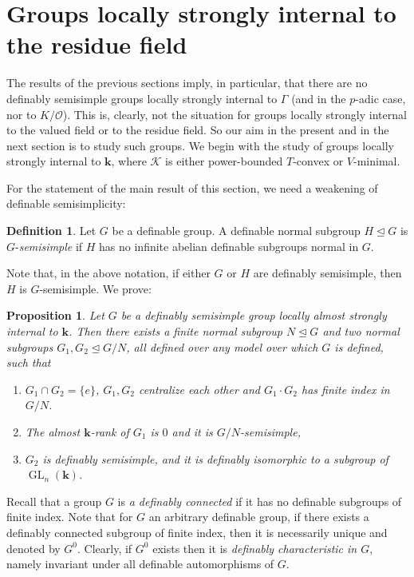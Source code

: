 \documentclass[11pt]{amsart}
\DeclareMathOperator{\gl}{GL} \DeclareMathOperator{\agl}{AGL}
\newtheorem{proposition}[theorem]{Proposition}
\theoremstyle{definition}
\newtheorem{definition}[theorem]{Definition}
\newcommand{\bk}{\textbf{k}}
\newcommand{\CK}{{\mathcal K}}
\newcommand{\CO}{{\mathcal O}}
\newcommand{\0}{\emptyset}
\begin{document}
\section{Groups locally strongly internal to the residue field}
The results of the previous sections imply, in particular, that there are no definably semisimple groups locally strongly internal to $\Gamma$ (and in the $p$-adic case, nor to $K/\CO$). This is, clearly, not the situation for groups locally strongly internal to the valued field or to the residue field. So our aim in the present and in the next section is to study such groups. We begin with the study of groups locally strongly internal to $\bk$, where $\CK$ is either power-bounded $T$-convex or $V$-minimal. 

For the statement of the main result of this section, we need a weakening of definable semisimplicity: 

\begin{definition}
    Let $G$ be a definable group. A definable normal subgroup $H\trianglelefteq G$ is $G$-\emph{semisimple} if $H$ has no infinite abelian definable subgroups normal in $G$.  
\end{definition}

Note that, in the above notation, if  either $G$ or $H$ are definably semisimple, then $H$ is $G$-semisimple. We prove: 


\begin{proposition}\label{P: k}
Let $G$ be a definably semisimple group locally almost strongly internal to $\bk$. Then there exists a finite normal subgroup $N\trianglelefteq G$ and two normal subgroups $G_1,G_2\trianglelefteq G/N$, all defined over any model over which  $G$ is defined, such that 
\begin{enumerate}   
    \item $G_1\cap G_2=\{e\}$,  $G_1,G_2$ centralize each other and  $G_1\cdot G_2$ has finite index in $G/N$.
    \item The almost $\bk$-rank of $G_1$ is $0$ and it is $G/N$-semisimple, 
    \item $G_2$ is definably semisimple, and it is definably isomorphic to a subgroup of $\gl_n(\bk)$. 
\end{enumerate}
\end{proposition}


Recall that a group $G$ is  \emph{a definably connected} if it has no definable subgroups of finite index. Note that for $G$ an arbitrary definable group, if there exists a definably connected subgroup of finite index, then it is necessarily unique and denoted by $G^0$.
Clearly, if $G^0$ exists then it is {\em definably characteristic in $G$}, namely invariant under all definable automorphisms of $G$. 
\end{document}
